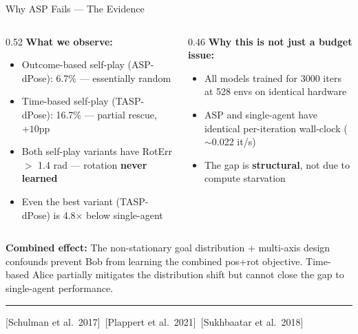\documentclass[aspectratio=169,xcolor=dvipsnames,t]{beamer}
\newcommand{\litfooter}[1]{%
  \vspace{2pt}%
  \hrule%
  \vspace{2pt}%
  {\tiny\color{LightDarkGrey} #1}%
}
\begin{document}
\begin{frame}[t]{Why ASP Fails — The Evidence}
  \begin{columns}[T,onlytextwidth]
    \begin{column}{0.52\textwidth}
      \textbf{What we observe:}
      \begin{itemize}
        \item Outcome-based self-play (ASP-dPose): 6.7\% — essentially random
        \item Time-based self-play (TASP-dPose): 16.7\% — partial rescue, $+10$pp
        \item Both self-play variants have RotErr $>$ 1.4 rad — rotation \textbf{never learned}
        \item Even the best variant (TASP-dPose) is 4.8$\times$ below single-agent
      \end{itemize}
    \end{column}
    \begin{column}{0.46\textwidth}
      \textbf{Why this is not just a budget issue:}
      \begin{itemize}
        \item All models trained for 3000 iters at 528 envs on identical hardware
        \item ASP and single-agent have identical per-iteration wall-clock ($\sim$0.022 it/s)
        \item The gap is \textbf{structural}, not due to compute starvation
      \end{itemize}
    \end{column}
  \end{columns}

  \vspace{6pt}
  \textbf{Combined effect:} The non-stationary goal distribution + multi-axis design confounds prevent Bob from learning the combined pos+rot objective. Time-based Alice partially mitigates the distribution shift but cannot close the gap to single-agent performance.

  \vfill\litfooter{[Schulman et al.\ 2017]~[Plappert et al.\ 2021]~[Sukhbaatar et al.\ 2018]}
\end{frame}
\end{document}
